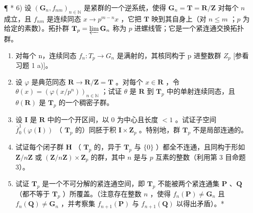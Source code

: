 ¶ * 6) 设 \((\mathbf{G}_n, f_{nm})_{n \in \mathbb{N}}\) 是紧群的一个逆系统，使得 \(\mathbf{G}_n = \mathbf{T} = \mathbf{R} / \mathbf{Z}\) 对每个 \(n\) 成立，且 \(f_{nm}\) 是连续同态 \(x \to p^{m-n}x\) ，它把 \(\mathbf{T}\) 映到其自身上（对 \(n \leqslant m\) ；\(p\) 为给定的素数）。拓扑群 \(\mathbf{T}_p = \varprojlim \mathbf{G}_n\) 称为 \(p\) 进螺线管；它是一个紧连通交换拓扑群。

\begin{enumerate}
\def\labelenumi{\alph{enumi})}
\item
  对每个 n，连续同态 \(f_{n}: T_{p} \to G_{n}\) 是满射的，其核同构于 p 进整数群 \(Z_{p}\) {[}参看习题 1 a){]}。
\item
  设 \(\varphi\) 是典范同态 \(\mathbf{R} \to \mathbf{R} / \mathbf{Z} = \mathbf{T}\) 。对每个 \(x \in \mathbf{R}\) ，令 \(\theta(x) = (\varphi(x / p^n))_{n \in \mathbb{N}}\) ；试证 \(\theta\) 是 \(\mathbf{R}\) 到 \(\mathbf{T}_p\) 中的单射连续同态，且 \(\theta(\mathbf{R})\) 是 \(\mathbf{T}_p\) 的一个稠密子群。
\item
  设 \(\mathbf{I}\) 是 \(\mathbf{R}\) 中的一个开区间，以 \(0\) 为中心且长度 \(< 1\) 。试证子空间 \(\overline{f}_{0}^{1}(\varphi(\mathbf{I}))\) （ \(\mathbf{T}_p\) 的）同胚于积 \(\mathbf{I} \times \mathbf{Z}_p\) 。特别地，群 \(\mathbf{T}_p\) 不是局部连通的。
\item
  试证每个闭子群 \(\mathbf{H}\) （ \(\mathbf{T}_p\) 的，异于 \(\mathbf{T}_p\) 与 \(\{0\}\) ）都全不连通，且同构于形如 \(\mathbf{Z}/n\mathbf{Z}\) 或 \((\mathbf{Z}/n\mathbf{Z}) \times \mathbf{Z}_p\) 的群，其中 \(n\) 是与 \(p\) 互素的整数（利用第 3 目命题 3）。
\item
  试证 \(\mathbf{T}_p\) 是一个不可分解的紧连通空间，即 \(\mathbf{T}_p\) 不能被两个紧连通集 \(\mathbf{P}\) 、\(\mathbf{Q}\) （都不等于 \(\mathbf{T}_p\) ）所覆盖。（注意存在整数 \(n\) ，使得 \(f_n(\mathbf{P}) \neq \mathbf{G}_n\) 且 \(f_n(\mathbf{Q}) \neq \mathbf{G}_n\) ，并考察集 \(f_{n+1}(\mathbf{P})\) 与 \(f_{n+1}(\mathbf{Q})\) 以得出矛盾）。*
\end{enumerate}

